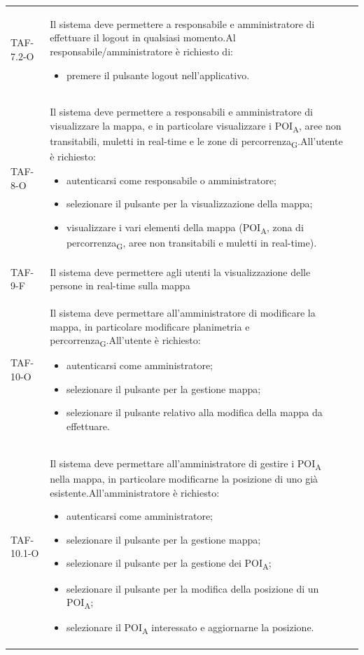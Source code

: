 \begin{longtable}{ >{\centering}p{} >{}p{}
		>{\centering}p{}}
	TAF-7.2-O & Il sistema deve permettere a responsabile e amministratore di effettuare il logout in qualsiasi momento.\newline Al responsabile/amministratore è richiesto di: \begin{itemize} \item premere il pulsante logout nell'applicativo. \end{itemize} & 0\tabularnewline
	
	TAF-8-O & Il sistema deve permettere a responsabili e amministratore di visualizzare la mappa, e in particolare visualizzare i \acrshort{POI}\textsubscript{A}, aree non transitabili, muletti in real-time e le zone di \gls{percorrenza}\textsubscript{G}.\newline All'utente è richiesto:\begin{itemize} \item autenticarsi come responsabile o amministratore; \item selezionare il pulsante per la visualizzazione della mappa; \item visualizzare i vari elementi della mappa (\acrshort{POI}\textsubscript{A}, zona di \gls{percorrenza}\textsubscript{G}, aree non transitabili e muletti in real-time). \end{itemize} & 0\tabularnewline
	
	TAF-9-F & Il sistema deve permettere agli utenti la visualizzazione delle persone in real-time sulla mappa & 0\tabularnewline
	
	TAF-10-O & Il sistema deve permettare all'amministratore di modificare la mappa, in particolare modificare planimetria e \gls{percorrenza}\textsubscript{G}.\newline All'utente è richiesto: \begin{itemize} \item autenticarsi come amministratore; \item selezionare il pulsante per la gestione mappa; \item selezionare il pulsante relativo alla modifica della mappa da effettuare.\end{itemize} & 0\tabularnewline
	
	TAF-10.1-O & Il sistema deve permettare all'amministratore di gestire i \acrshort{POI}\textsubscript{A} nella mappa, in particolare modificarne la posizione di uno già esistente.\newline All'amministratore è richiesto: \begin{itemize}\item autenticarsi come amministratore; \item selezionare il pulsante per la gestione mappa; \item selezionare il pulsante per la gestione dei \acrshort{POI}\textsubscript{A}; \item selezionare il pulsante per la modifica della posizione di un \acrshort{POI}\textsubscript{A}; \item selezionare il \acrshort{POI}\textsubscript{A} interessato e aggiornarne la posizione.\end{itemize} & 0\tabularnewline
	

\end{longtable}
